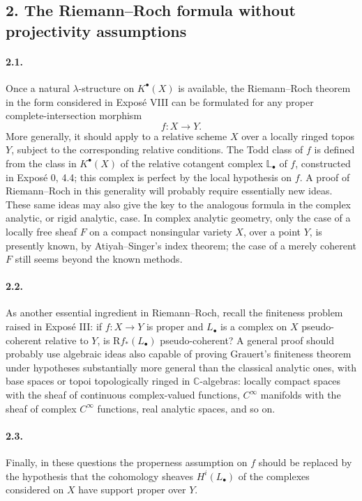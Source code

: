 \documentclass[12pt]{article}
\newcommand{\CC}{\mathbb C}
\newcommand{\RR}{\mathrm R}
\begin{document}
\subsection*{2. The Riemann--Roch formula without projectivity assumptions}

\paragraph{2.1.}
Once a natural $\lambda$-structure on $K^\bullet(X)$ is available, the Riemann--Roch theorem in the form considered in Exposé VIII can be formulated for any proper complete-intersection morphism
\[
f:X\to Y.
\]
More generally, it should apply to a relative scheme $X$ over a locally ringed topos $Y$, subject to the corresponding relative conditions. The Todd class of $f$ is defined from the class in $K^\bullet(X)$ of the relative cotangent complex $\mathbb L_\bullet$ of $f$, constructed in Exposé 0, 4.4; this complex is perfect by the local hypothesis on $f$. A proof of Riemann--Roch in this generality will probably require essentially new ideas. These same ideas may also give the key to the analogous formula in the complex analytic, or rigid analytic, case. In complex analytic geometry, only the case of a locally free sheaf $F$ on a compact nonsingular variety $X$, over a point $Y$, is presently known, by Atiyah--Singer's index theorem; the case of a merely coherent $F$ still seems beyond the known methods.

\paragraph{2.2.}
As another essential ingredient in Riemann--Roch, recall the finiteness problem raised in Exposé III: if $f:X\to Y$ is proper and $L_\bullet$ is a complex on $X$ pseudo-coherent relative to $Y$, is $\RR f_*(L_\bullet)$ pseudo-coherent? A general proof should probably use algebraic ideas also capable of proving Grauert's finiteness theorem under hypotheses substantially more general than the classical analytic ones, with base spaces or topoi topologically ringed in $\CC$-algebras: locally compact spaces with the sheaf of continuous complex-valued functions, $C^\infty$ manifolds with the sheaf of complex $C^\infty$ functions, real analytic spaces, and so on.

\paragraph{2.3.}
Finally, in these questions the properness assumption on $f$ should be replaced by the hypothesis that the cohomology sheaves $H^i(L_\bullet)$ of the complexes considered on $X$ have support proper over $Y$.
\end{document}
